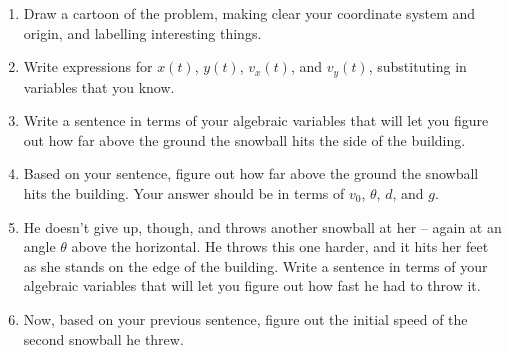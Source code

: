 \documentclass[12pt]{article}
\begin{document}
\begin{enumerate}

\item Draw a cartoon of the problem, making clear your coordinate system and origin, and
labelling interesting things.

\vspace{3in}

\item Write expressions for $x(t)$, $y(t)$, $v_x(t)$, and $v_y(t)$, substituting in variables that you know.

\vspace{1.5in}

\item Write a sentence in terms of your algebraic variables that will let you figure out how far above the ground 
the snowball hits the side of the building.

\newpage

\item Based on your sentence, figure out how far above the ground the snowball hits the building. Your answer should be 
in terms of $v_0$, $\theta$, $d$, and $g$.

\vspace{3in}

\item He doesn't give up, though, and throws another snowball at her -- again at an angle $\theta$ above the horizontal.
He throws this one harder, and it hits her feet as she stands on the edge of the building. Write a sentence in terms of your algebraic variables that will let you figure out how fast he had to throw it. 

\vspace{1.5in}

\item Now, based on your previous sentence, figure out the initial speed of the second snowball he threw.

\end{enumerate}
\end{document}
